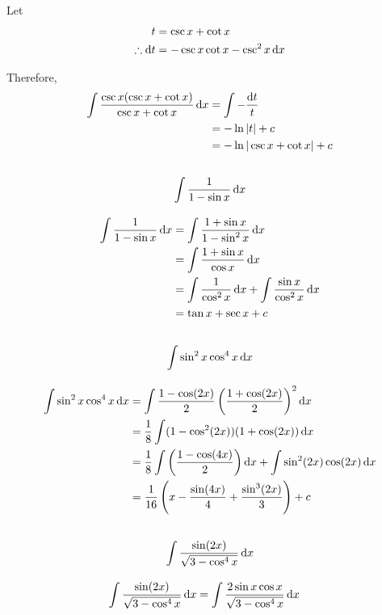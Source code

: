 \documentclass[fleqn, a4paper]{article}
\begin{document}
Let
\begin{align*}
	t &= \csc x + \cot x\\
	\therefore \dif t &= -\csc x \cot x -\csc^2 x \dif x
\end{align*}

Therefore,
\begin{align*}
	\int \dfrac{\csc x (\csc x + \cot x)}{\csc x + \cot x} \dif x &= \int -\dfrac{\dif t}{t}\\
	&= -\ln |t| + c\\
	&= -\ln |\csc x + \cot x| + c
\end{align*}

\subsection{\[\int \dfrac{1}{1 - \sin x} \dif x\]}

\begin{align*}
	\int \dfrac{1}{1 - \sin x} \dif x &= \int \dfrac{1 + \sin x}{1 - \sin^2 x} \dif x\\
	&= \int \dfrac{1 + \sin x}{\cos x} \dif x\\
	&= \int \dfrac{1}{\cos^2 x} \dif x + \int \dfrac{\sin x}{\cos^2 x} \dif x\\
	&= \tan x + \sec x + c
\end{align*}

\subsection{\[\int \sin^2 x \cos^4 x \dif x\]}

\begin{align*}
	\int \sin^2 x \cos^4 x \dif x &= \int \dfrac{1 - \cos (2x)}{2} \left( \dfrac{1 + \cos (2x)}{2} \right)^2 \dif x\\
	&= \dfrac{1}{8} \int (1 - \cos^2 (2x))(1 + \cos (2x)) \dif x\\
	&= \dfrac{1}{8} \int \left( \dfrac{1 - \cos (4x)}{2} \right) \dif x + \int \sin^2 (2x) \cos (2x) \dif x\\
	&= \dfrac{1}{16} \left( x - \dfrac{\sin (4x)}{4} + \dfrac{\sin^3 (2x)}{3} \right) + c
\end{align*}

\subsection{\[\int \dfrac{\sin (2x)}{\sqrt{3 - \cos^4 x}} \dif x\]}

\begin{align*}
	\int \dfrac{\sin (2x)}{\sqrt{3 - \cos^4 x}} \dif x &= \int \dfrac{2 \sin x \cos x}{\sqrt{3 - \cos^4 x}} \dif x
\end{align*}
\end{document}
